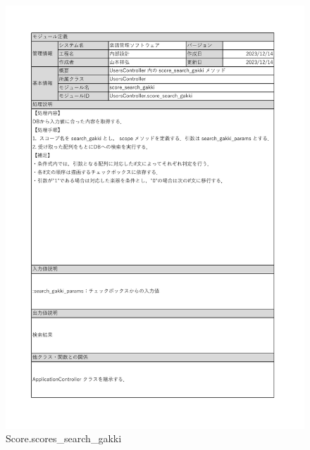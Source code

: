 \begin{figure}
    \centering
    \includegraphics[scale=0.5]{img/Method/Scores_search_gakki(scope).pdf}
    \caption{Score.scores\_search\_gakki}
\end{figure}
\clearpage

